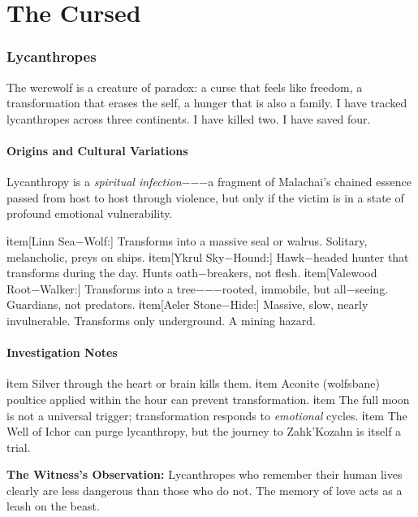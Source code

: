 \part{The Cursed}

\section{Lycanthropes}

The werewolf is a creature of paradox: a curse that feels like freedom, a transformation that erases the self, a hunger that is also a family. I have tracked lycanthropes across three continents. I have killed two. I have saved four.

\subsection{Origins and Cultural Variations}

Lycanthropy is a \emph{spiritual infection}−−−a fragment of Malachai's chained essence passed from host to host through violence, but only if the victim is in a state of profound emotional vulnerability.

\begin{description}
  ℹtem[Linn Sea−Wolf:] Transforms into a massive seal or walrus. Solitary, melancholic, preys on ships.
  ℹtem[Ykrul Sky−Hound:] Hawk−headed hunter that transforms during the day. Hunts oath−breakers, not flesh.
  ℹtem[Valewood Root−Walker:] Transforms into a tree−−−rooted, immobile, but all−seeing. Guardians, not predators.
  ℹtem[Aeler Stone−Hide:] Massive, slow, nearly invulnerable. Transforms only underground. A mining hazard.
\end{description}

\subsection{Investigation Notes}

\begin{itemize}
  ℹtem Silver through the heart or brain kills them.
  ℹtem Aconite (wolfsbane) poultice applied within the hour can prevent transformation.
  ℹtem The full moon is not a universal trigger; transformation responds to \emph{emotional} cycles.
  ℹtem The Well of Ichor can purge lycanthropy, but the journey to Zahk'Kozahn is itself a trial.
\end{itemize}

\textbf{The Witness's Observation:} Lycanthropes who remember their human lives clearly are less dangerous than those who do not. The memory of love acts as a leash on the beast.

